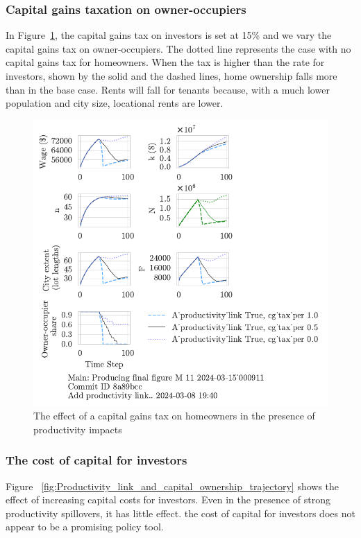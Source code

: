 \subsubsection{Capital gains taxation on owner-occupiers}
In Figure~\ref{fig:Productivity_link_and_CGpers_ownership_trajectory}, the capital gains tax on investors is set at 15\% and we vary the capital gains tax on owner-occupiers. The dotted line represents the case with no capital gains tax for homeowners. When the tax is higher than the rate for investors, shown by the solid and the dashed lines,  home ownership falls more than in the base case.  Rents will fall for tenants because, with a much lower population and city size, locational rents are lower.


\begin{figure}
    \centering
    \includegraphics[scale=.8, trim={0 1.4cm 0 0},clip]{fig/With-productivity_link_cg_tax_per-000911.pdf}
    \caption{The effect of a capital gains tax on homeowners in the presence of productivity impacts}
    \label{fig:Productivity_link_and_CGpers_ownership_trajectory}
\end{figure}

\newpage

\subsubsection{The cost of capital for investors}
Figure ~\ref{fig:Productivity_link_and_capital_ownership_trajectory} shows the effect of increasing capital costs for investors. Even in the presence of strong productivity spillovers, it has little effect.  the cost of capital for investors does not appear to be a promising policy tool.

